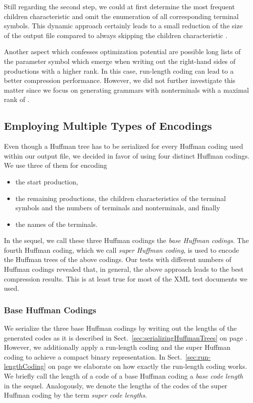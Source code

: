 \documentclass[12pt]{llncs}
\begin{document}
Still regarding the second step, we could at first determine the most frequent children characteristic and omit the enumeration of all corresponding terminal symbols. This dynamic approach certainly leads to a small reduction of the size of the output file compared to always skipping the children characteristic .

Another aspect which confesses optimization potential are possible long lists of the parameter symbol  which emerge when writing out the right-hand sides of productions with a higher rank. In this case, run-length coding can lead to a better compression performance. However, we did not further investigate this matter since we focus on generating grammars with nonterminals with a maximal rank of .

\subsection{Employing Multiple Types of Encodings}\label{sec:huffmanCoding}

Even though a Huffman tree has to be serialized for every Huffman coding used within our output file, we decided in favor of using four distinct Huffman codings. We use three of them for encoding 
\begin{itemize}
	\item the start production, 
	\item the remaining productions, the children characteristics of the terminal symbols and the numbers of terminals and nonterminals, and finally
	\item the names of the terminals.
\end{itemize}
In the sequel, we call these three Huffman codings the \emph{base Huffman codings}. The fourth Huffman coding, which we call \emph{super Huffman coding}, is used to encode the Huffman trees of the above codings. Our tests with different numbers of Huffman codings revealed that, in general, the above approach leads to the best compression results. This is at least true for most of the XML test documents we used.

\subsubsection{Base Huffman Codings}

We serialize the three base Huffman codings by writing out the lengths of the generated codes as it is described in Sect.~\ref{sec:serializingHuffmanTrees} on page \pageref{sec:serializingHuffmanTrees}. However, we additionally apply a run-length coding and the super Huffman coding to achieve a compact binary representation. In Sect.~\ref{sec:run-lengthCoding} on page \pageref{sec:run-lengthCoding} we elaborate on how exactly the run-length coding works. We briefly call the length of a code of a base Huffman coding a \emph{base code length} in the sequel. Analogously, we denote the lengths of the codes of the super Huffman coding by the term \emph{super code lengths}.
\end{document}

